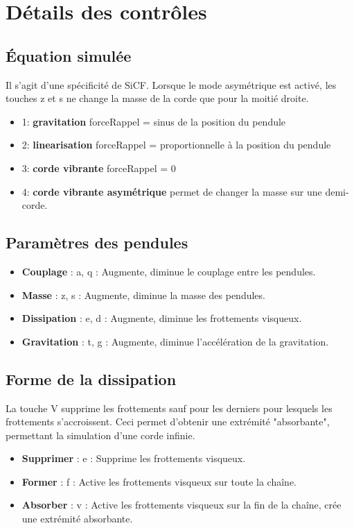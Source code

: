 \section{Détails des contrôles}
%
%
\subsection{Équation simulée}
%
Il s'agit d'une spécificité de SiCF. Lorsque le mode asymétrique est activé, les touches {\sf z} et {\sf s} ne change la masse de la corde que pour la moitié droite. 
%
\begin{itemize}[leftmargin=2cm, label=, itemsep=0pt]%
\item 1: {\bf gravitation} forceRappel = sinus de la position du pendule
\item 2: {\bf linearisation} forceRappel = proportionnelle à la position du pendule
\item 3: {\bf corde vibrante} forceRappel = 0
\item 4: {\bf corde vibrante asymétrique} permet de changer la masse sur une demi-corde.
\end{itemize}
%
\subsection{Paramètres des pendules}
%
\begin{itemize}[label=, leftmargin=2cm, itemsep=0pt]
\item {\bf Couplage} : {\sf a}, {\sf q} : Augmente, diminue le couplage entre les pendules.
\item {\bf Masse} : {\sf z}, {\sf s} :  Augmente, diminue la masse des pendules.
\item {\bf Dissipation} : {\sf e}, {\sf d} :  Augmente, diminue les frottements visqueux.
\item {\bf Gravitation} : {\sf t}, {\sf g} :  Augmente, diminue l'accélération de la gravitation.
\end{itemize}
%
%
\subsection{Forme de la dissipation}
%
La touche {\sf V} supprime les frottements sauf pour les derniers pour lesquels les frottements s'accroissent. Ceci permet d'obtenir une extrémité "absorbante", permettant la simulation d'une corde infinie.
%
\begin{itemize}[label=, leftmargin=2cm, itemsep=0pt]
\item {\bf Supprimer} : {\sf e} : Supprime les frottements visqueux.
\item {\bf Former} : {\sf f} : Active les frottements visqueux sur toute la chaîne.
\item {\bf Absorber} : {\sf v} : Active les frottements visqueux sur la fin de la chaîne, crée une extrémité absorbante.
\end{itemize}
%
%
